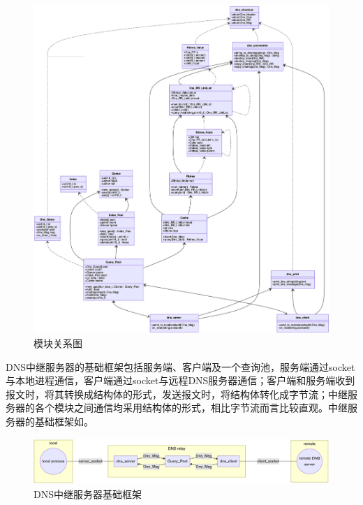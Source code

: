 \documentclass[lang=cn,11pt,a4paper,cite=authornum]{paper}
\begin{document}
\begin{figure}[htbp]

    \centering
    \includegraphics[width=\linewidth]{./Images/structure.png}
    \caption{模块关系图\label{fig:structure}}

\end{figure}

DNS中继服务器的基础框架包括服务端、客户端及一个查询池，服务端通过socket与本地进程通信，客户端通过socket与远程DNS服务器通信；客户端和服务端收到报文时，将其转换成结构体的形式，发送报文时，将结构体转化成字节流；中继服务器的各个模块之间通信均采用结构体的形式，相比字节流而言比较直观。中继服务器的基础框架如。

\begin{figure}[htbp]

    \centering
    \includegraphics[width=\linewidth]{./Images/structure2.png}
    \caption{DNS中继服务器基础框架\label{fig:structure2}}

\end{figure}
\end{document}
